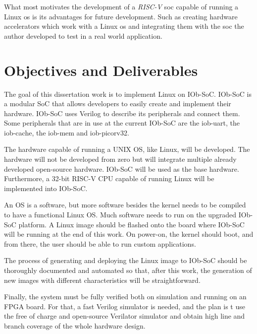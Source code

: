 What most motivates the development of a \textit{RISC-V} \acrshort{soc} capable of running a Linux \acrshort{os} is its advantages for future development. Such as creating hardware accelerators which work with a Linux \acrshort{os} and integrating them with the \acrshort{soc} the author developed to test in a real world application.

\section{Objectives and Deliverables}
\label{section:objectives}
The goal of this dissertation work is to implement Linux on IOb-SoC. IOb-SoC is a modular SoC that allows developers to easily create and implement their hardware. IOb-SoC uses Verilog to describe its peripherals and connect them. Some peripherals that are in use at the current IOb-SoC are the iob-uart, the iob-cache, the iob-mem and iob-picorv32.

The hardware capable of running a UNIX OS, like Linux, will be developed. The hardware will not be developed from zero but will integrate multiple already developed open-source hardware. IOb-SoC will be used as the base hardware. Furthermore, a 32-bit RISC-V CPU capable of running Linux will be implemented into IOb-SoC.

An OS is a software, but more software besides the kernel needs to be compiled to have a functional Linux OS. Much software needs to run on the upgraded IOb-SoC platform. A Linux image should be flashed onto the board where IOb-SoC will be running at the end of this work. On power-on, the kernel should boot, and from there, the user should be able to run custom applications. 

The process of generating and deploying the Linux image to IOb-SoC should be thoroughly documented and automated so that, after this work, the generation of new images with different characteristics will be straightforward.

Finally, the system must be fully verified both on simulation and running on an FPGA board. For that, a fast Verilog simulator is needed, and the plan is t use the free of charge and open-source Verilator simulator and obtain high line and branch coverage of the whole hardware design.

